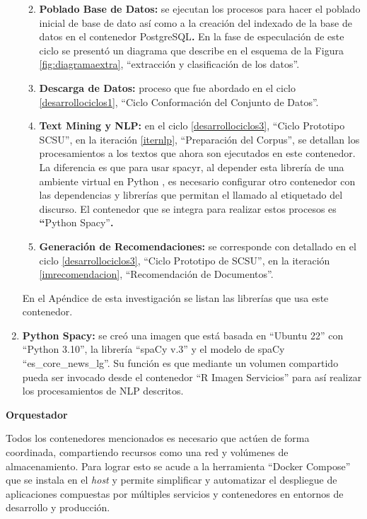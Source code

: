 \documentclass[
  12pt,
  openany]{book}
\providecommand{\tightlist}{%
  \setlength{\itemsep}{0pt}\setlength{\parskip}{0pt}}
\begin{document}
\begin{enumerate}
  \begin{enumerate}
  \def\labelenumii{\roman{enumii}.}
  \tightlist
  \item
    \textbf{Poblado Base de Datos:} se ejecutan los procesos para hacer el poblado inicial de base de dato así como a la creación del indexado de la base de datos en el contenedor PostgreSQL\textbf{.} En la fase de especulación de este ciclo se presentó un diagrama que describe en el esquema de la Figura \ref{fig:diagramaextra}, ``extracción y clasificación de los datos''.
  \item
    \textbf{Descarga de Datos:} proceso que fue abordado en el ciclo \ref{desarrollociclos1}, ``Ciclo Conformación del Conjunto de Datos''.
  \item
    \textbf{Text Mining y NLP:} en el ciclo \ref{desarrollociclos3}, ``Ciclo Prototipo SCSU'', en la iteración \ref{iternlp}, ``Preparación del Corpus'', se detallan los procesamientos a los textos que ahora son ejecutados en este contenedor. La diferencia es que para usar spacyr, al depender esta librería de una ambiente virtual en Python , es necesario configurar otro contenedor con las dependencias y librerías que permitan el llamado al etiquetado del discurso. El contenedor que se integra para realizar estos procesos es \textbf{``}Python Spacy''\textbf{.}
  \item
    \textbf{Generación de Recomendaciones:} se corresponde con detallado en el ciclo \ref{desarrollociclos3}, ``Ciclo Prototipo de SCSU'', en la iteración \ref{imrecomendacion}, ``Recomendación de Documentos''.
  \end{enumerate}

  En el Apéndice de esta investigación se listan las librerías que usa este contenedor.
\item
  \textbf{Python Spacy:} se creó una imagen que está basada en ``Ubuntu 22'' con ``Python 3.10'', la librería ``spaCy v.3'' y el modelo de spaCy ``es\_core\_news\_lg''. Su función es que mediante un volumen compartido pueda ser invocado desde el contenedor ``R Imagen Servicios'' para así realizar los procesamientos de NLP descritos.

  \newpage
\end{enumerate}

\textbf{Orquestador}

Todos los contenedores mencionados es necesario que actúen de forma coordinada, compartiendo recursos como una red y volúmenes de almacenamiento. Para lograr esto se acude a la herramienta ``Docker Compose'' que se instala en el \emph{host} y permite simplificar y automatizar el despliegue de aplicaciones compuestas por múltiples servicios y contenedores en entornos de desarrollo y producción.
\end{document}
